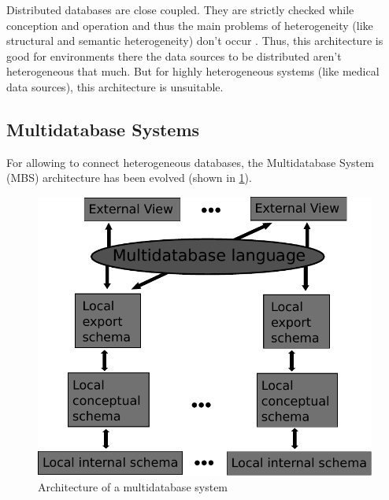Distributed databases are close coupled. They are strictly checked while conception and operation and thus the main problems of heterogeneity (like structural and semantic heterogeneity) don't occur \cite[p. 93]{DBLP:books/dp/LeserN2006}. Thus, this architecture is good for environments there the data sources to be distributed aren't heterogeneous that much. But for highly heterogeneous systems (like medical data sources), this architecture is unsuitable. 

\subsection{Multidatabase Systems}

For allowing to connect heterogeneous databases, the Multidatabase System (MBS) architecture has been evolved (shown in \ref{MBSDatabaseArchitecture}). 

\begin{figure}[H]
	\begin{center}
		\includegraphics[scale=0.5]{figures/MultidatabaseArchitecture.pdf}
	\end{center}
	\caption{Architecture of a  multidatabase system \cite[p. 94]{DBLP:books/dp/LeserN2006}}
	\label{MBSDatabaseArchitecture}
\end{figure}

